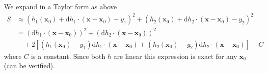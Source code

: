 We expand in a Taylor form as above
$$
\begin{aligned}
  S & \approx \left( h_1(\mathbf{x}_0) + \mathrm{d} h_1 \cdot (\mathbf{x} - \mathbf{x}_0) - y_1 \right)^2 +  \left( h_2(\mathbf{x}_0) + \mathrm{d} h_2 \cdot (\mathbf{x} - \mathbf{x}_0) - y_2 \right)^2 \\
  & = (\mathrm{d} h_1 \cdot (\mathbf{x} - \mathbf{x}_0))^2 + (\mathrm{d} h_2 \cdot (\mathbf{x} - \mathbf{x}_0) )^2 \\
  & \quad + 2 \left[ (h_1(\mathbf{x}_0) - y_1) \mathrm{d} h_1 \cdot (\mathbf{x} - \mathbf{x}_0) + (h_2(\mathbf{x}_0) - y_2) \mathrm{d} h_2 \cdot (\mathbf{x} - \mathbf{x}_0)\right] + C
\end{aligned}
$$
where $C$ is a constant. Since both $h$ are linear this expression is exact for any $\mathbf{x}_0$ (can be verified).

